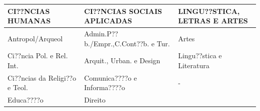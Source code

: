 \documentclass[]{article}
\begin{document}
\begin{longtable}[]{@{}lll@{}}
\toprule
\begin{minipage}[b]{0.03\columnwidth}\raggedright\strut
CI??NCIAS HUMANAS\strut
\end{minipage} & \begin{minipage}[b]{0.03\columnwidth}\raggedright\strut
CI??NCIAS SOCIAIS APLICADAS\strut
\end{minipage} & \begin{minipage}[b]{0.03\columnwidth}\raggedright\strut
LINGU??STICA, LETRAS E ARTES\strut
\end{minipage}\tabularnewline
\midrule
\endhead
\begin{minipage}[t]{0.03\columnwidth}\raggedright\strut
Antropol/Arqueol\strut
\end{minipage} & \begin{minipage}[t]{0.03\columnwidth}\raggedright\strut
Admin.P??b./Empr.,C.Cont??b. e Tur.\strut
\end{minipage} & \begin{minipage}[t]{0.03\columnwidth}\raggedright\strut
Artes\strut
\end{minipage}\tabularnewline
\begin{minipage}[t]{0.03\columnwidth}\raggedright\strut
Ci??ncia Pol. e Rel. Int.\strut
\end{minipage} & \begin{minipage}[t]{0.03\columnwidth}\raggedright\strut
Arquit., Urban. e Design\strut
\end{minipage} & \begin{minipage}[t]{0.03\columnwidth}\raggedright\strut
Lingu??stica e Literatura\strut
\end{minipage}\tabularnewline
\begin{minipage}[t]{0.03\columnwidth}\raggedright\strut
Ci??ncias da Religi??o e Teol.\strut
\end{minipage} & \begin{minipage}[t]{0.03\columnwidth}\raggedright\strut
Comunica????o e Informa????o\strut
\end{minipage} & \begin{minipage}[t]{0.03\columnwidth}\raggedright\strut
-\strut
\end{minipage}\tabularnewline
\begin{minipage}[t]{0.03\columnwidth}\raggedright\strut
Educa????o\strut
\end{minipage} & \begin{minipage}[t]{0.03\columnwidth}\raggedright\strut
Direito\strut

\end{minipage}
\end{longtable}
\end{document}

